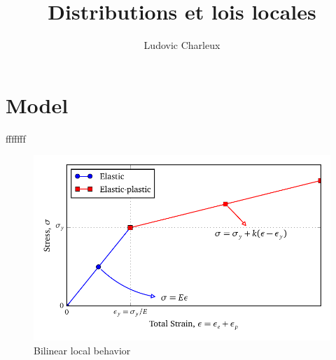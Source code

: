 \documentclass[12pt, twoside]{article}
\title{Distributions et lois locales}
\author{Ludovic Charleux}
\begin{document}
\maketitle

\section{Model}
fffffff

\begin{figure}[h]
\begin{center}
\includegraphics[width =1.\textwidth]{local_behavior.pdf}
\caption{Bilinear local behavior}
\label{fig:local_behavior}
\end{center}
\end{figure}
\end{document}
